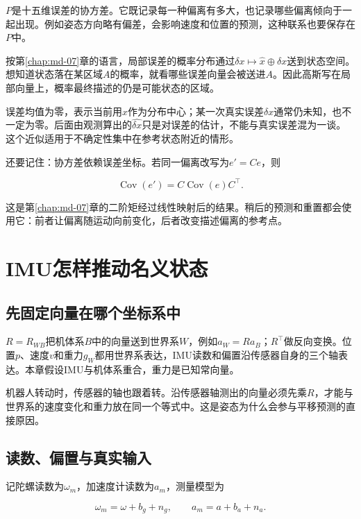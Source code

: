 $P$是十五维误差的协方差。它既记录每一种偏离有多大，也记录哪些偏离倾向于一起出现。例如姿态方向略有偏差，会影响速度和位置的预测，这种联系也要保存在$P$中。

按第\ref{chap:md-07}章的语言，局部误差的概率分布通过$\delta x\mapsto\hat x\oplus\delta x$送到状态空间。想知道状态落在某区域$A$的概率，就看哪些误差向量会被送进$A$。因此高斯写在局部向量上，概率最终描述的仍是可能状态的区域。

误差均值为零，表示当前用$\hat x$作为分布中心；某一次真实误差$\delta x$通常仍未知，也不一定为零。后面由观测算出的$\widehat{\delta x}$只是对误差的估计，不能与真实误差混为一谈。这个近似适用于不确定性集中在参考状态附近的情形。

还要记住：协方差依赖误差坐标。若同一偏离改写为$e'=Ce$，则

\begin{equation*}
\operatorname{Cov}(e')=C\operatorname{Cov}(e)C^\top.
\end{equation*}

这是第\ref{chap:md-07}章的二阶矩经过线性映射后的结果。稍后的预测和重置都会使用它：前者让偏离随运动向前变化，后者改变描述偏离的参考点。

\section{IMU怎样推动名义状态}

\subsection{先固定向量在哪个坐标系中}

$R=R_{WB}$把机体系$B$中的向量送到世界系$W$，例如$a_W=Ra_B$；$R^\top$做反向变换。位置$p$、速度$v$和重力$g_W$都用世界系表达，IMU读数和偏置沿传感器自身的三个轴表达。本章假设IMU与机体系重合，重力是已知常向量。

机器人转动时，传感器的轴也跟着转。沿传感器轴测出的向量必须先乘$R$，才能与世界系的速度变化和重力放在同一个等式中。这是姿态为什么会参与平移预测的直接原因。

\subsection{读数、偏置与真实输入}

记陀螺读数为$\omega_m$，加速度计读数为$a_m$，测量模型为

\begin{equation*}
\omega_m=\omega+b_g+n_g,\qquad a_m=a+b_a+n_a.
\end{equation*}


